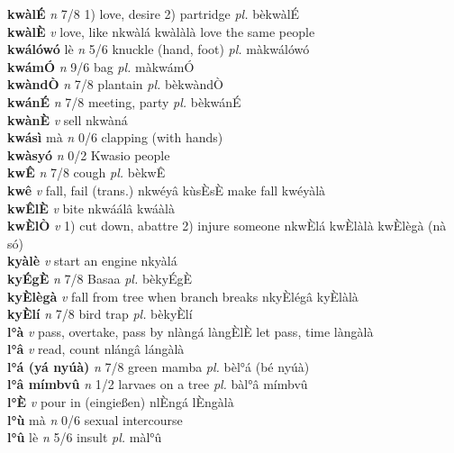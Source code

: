\documentclass{article}
\begin{document}
{\bf kwàlÉ}  {\it n} 7/8 1) love, desire 2) partridge {\it pl.} bèkwàlÉ         \\ 
{\bf kwàlÈ}  {\it v} love, like   nkwàlá   kwàlàlà love the same people   \\ 
{\bf kwálówó} lè {\it n} 5/6 knuckle (hand, foot) {\it pl.} màkwálówó         \\ 
{\bf kwámÓ}  {\it n} 9/6 bag {\it pl.} màkwámÓ         \\ 
{\bf kwàndÒ}  {\it n} 7/8 plantain {\it pl.} bèkwàndÒ         \\ 
{\bf kwánÉ}  {\it n} 7/8 meeting, party {\it pl.} bèkwánÉ         \\ 
{\bf kwànÈ}  {\it v} sell   nkwàná      \\ 
{\bf kwásì} mà {\it n} 0/6 clapping (with hands)         \\ 
{\bf kwàsyó}  {\it n} 0/2 Kwasio people         \\ 
{\bf kwÊ}  {\it n} 7/8 cough {\it pl.} bèkwÊ         \\ 
{\bf kwê}  {\it v} fall, fail (trans.)   nkwéyâ  kùsÈsÈ make fall kwéyàlà   \\ 
{\bf kwÊlÈ}  {\it v} bite   nkwáálâ   kwáàlà   \\ 
{\bf kwÈlÒ}  {\it v} 1) cut down, abattre 2) injure someone   nkwÈlá   kwÈlàlà kwÈlègà (nà só)  \\ 
{\bf kyàlè}  {\it v} start an engine   nkyàlá      \\ 
{\bf kyÉgÈ}  {\it n} 7/8 Basaa {\it pl.} bèkyÉgÈ         \\ 
{\bf kyÈlègà}  {\it v} fall from tree when branch breaks   nkyÈlégâ   kyÈlàlà   \\ 
{\bf kyÈlí}  {\it n} 7/8 bird trap {\it pl.} bèkyÈlí         \\ 
{\bf l°à}  {\it v} pass, overtake, pass by   nlàngá làngÈlÈ let pass, time  làngàlà   \\ 
{\bf l°â}  {\it v} read, count   nlángâ   lángàlà   \\ 
{\bf l°á (yá nyúà)}  {\it n} 7/8 green mamba {\it pl.} bèl°á (bé nyúà)         \\ 
{\bf l°â mímbvû}  {\it n} 1/2 larvaes on a tree {\it pl.} bàl°â mímbvû         \\ 
{\bf l°È}  {\it v} pour in (eingießen)   nlÈngá   lÈngàlà   \\ 
{\bf l°ù} mà {\it n} 0/6 sexual intercourse         \\ 
{\bf l°û} lè {\it n} 5/6 insult {\it pl.} màl°û         \\ 
\end{document}
